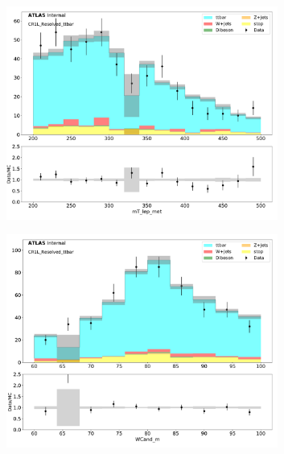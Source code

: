 \begin{figure}[htbp]
  \centering
     \begin{subfigure}{0.49\textwidth}
     \includegraphics[width = 0.98\textwidth]{Figures/4/datamc/CR1L_Resolved_ttbar/mT_lep_met.pdf}
     \caption{\mtlepmet}
     \end{subfigure}
     \begin{subfigure}{0.49\textwidth}
     \includegraphics[width = 0.98\textwidth]{Figures/4/datamc/CR1L_Resolved_ttbar/WCand_m.pdf}
     \caption{\Wcandm}
     \end{subfigure}
     \begin{subfigure}{0.49\textwidth}

\end{subfigure}
\end{figure}
